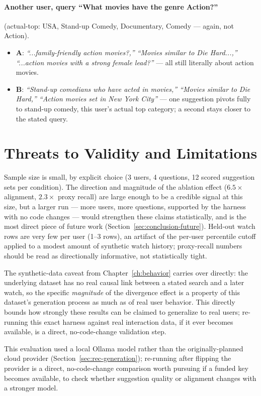 \paragraph{Another user, query ``What movies have the genre Action?''} (actual-top: USA, Stand-up
Comedy, Documentary, Comedy --- again, not Action).
\begin{itemize}
    \item \textbf{A}: \emph{``...family-friendly action movies?,'' ``Movies similar to Die
        Hard...,'' ``...action movies with a strong female lead?''} --- all still literally about
        action movies.
    \item \textbf{B}: \emph{``Stand-up comedians who have acted in movies,'' ``Movies similar to
        Die Hard,'' ``Action movies set in New York City''} --- one suggestion pivots fully to
        stand-up comedy, this user's actual top category; a second stays closer to the stated query.
\end{itemize}

\section{Threats to Validity and Limitations}
\label{sec:eval-limits}

Sample size is small, by explicit choice (3 users, 4 questions, 12 scored suggestion sets per
condition). The direction and magnitude of the ablation effect ($6.5\times$ alignment, $2.3\times$
proxy recall) are large enough to be a credible signal at this size, but a larger run --- more
users, more questions, supported by the harness with no code changes --- would strengthen these
claims statistically, and is the most direct piece of future work
(Section~\ref{sec:conclusion-future}). Held-out watch rows are very few per user (1--3 rows), an
artifact of the per-user percentile cutoff applied to a modest amount of synthetic watch history;
proxy-recall numbers should be read as directionally informative, not statistically tight.

The synthetic-data caveat from Chapter~\ref{ch:behavior} carries over directly: the underlying
dataset has no real causal link between a stated search and a later watch, so the specific
\emph{magnitude} of the divergence effect is a property of this dataset's generation process as
much as of real user behavior. This directly bounds how strongly these results can be claimed to
generalize to real users; re-running this exact harness against real interaction data, if it ever
becomes available, is a direct, no-code-change validation step.

This evaluation used a local Ollama model rather than the originally-planned cloud provider
(Section~\ref{sec:rec-generation}); re-running after flipping the provider is a direct,
no-code-change comparison worth pursuing if a funded key becomes available, to check whether
suggestion quality or alignment changes with a stronger model.
